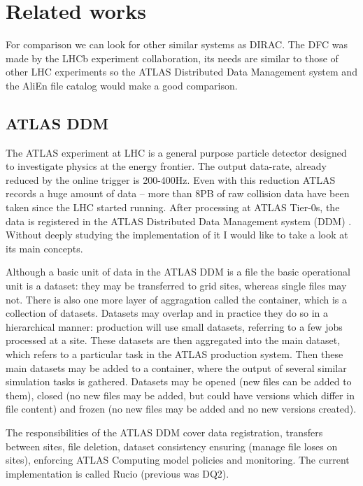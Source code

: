 \chapter{Related works}

For comparison we can look for other similar systems as DIRAC. The DFC was made by the LHCb experiment collaboration,
its needs are similar to those of other LHC experiments so the ATLAS Distributed Data Management system and the AliEn 
file catalog would make a good comparison.


\section{ATLAS DDM}
The ATLAS experiment at LHC is a general purpose particle detector designed to investigate physics at the energy
frontier. The output data-rate, already reduced by the online trigger is  200-400Hz. Even with this reduction 
ATLAS records a huge amount of data – more than 8PB of raw collision data have been taken since the LHC
started running. After processing at ATLAS Tier-0s, the data is registered in the ATLAS Distributed Data Management
system (DDM) \cite{ATLASDDM1}. Without deeply studying the implementation of it I would like to take a look 
at its main concepts.

Although a basic unit of data in the ATLAS DDM is a file the basic operational unit is a dataset: they may be
transferred to grid sites, whereas single files may not. There is also one more layer of aggragation called the 
container, which is a collection of datasets. Datasets may overlap and in practice they do so in a 
hierarchical manner: production will use small datasets, referring to a few jobs processed at a site. These datasets
are then aggregated into the main dataset, which refers to a particular task in the ATLAS
production system. Then these main datasets may be added to a container, where the output of several 
similar simulation tasks is gathered. Datasets may be opened (new files can be added to them), closed (no new files
may be added, but could have versions which differ in file content) and frozen (no new files may be added and no 
new versions created). 

The responsibilities of the ATLAS DDM cover data registration, transfers between sites, file deletion, dataset 
consistency ensuring (manage file loses on sites), enforcing ATLAS Computing model policies and monitoring. The
current implementation is called Rucio (previous was DQ2).



